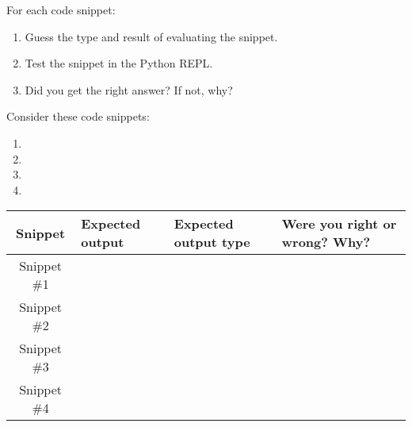 \documentclass[11pt]{article}
\begin{document}
For each code snippet:
\begin{enumerate}
  \item
    Guess the type and result of evaluating the snippet.
  \item
    Test the snippet in the Python REPL.
  \item
    Did you get the right answer? If not, why?
\end{enumerate}
%
Consider these code snippets:
\begin{enumerate}
  \item
    

  \item
    

  \item
    

  \item
    
\end{enumerate}

\renewcommand{\arraystretch}{3.5}
\begin{tabular}{| c | p{5em}| p{5em} | p{21em} |}
    \hline %
    \textbf{Snippet} & \textbf{Expected output}
    & \textbf{Expected output type} & \textbf{Were you right or wrong? Why?} \\ \hline
    Snippet \#1 & ~ & ~ & ~ \\ \hline
    Snippet \#2 & ~ & ~ & ~ \\ \hline
    Snippet \#3 & ~ & ~ & ~ \\ \hline
    Snippet \#4 & ~ & ~ & ~ \\ \hline
\end{tabular}
\end{document}

